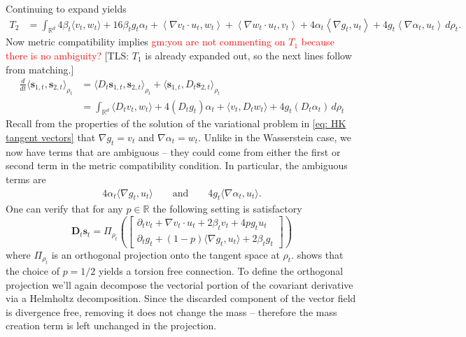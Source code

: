 \documentclass{article}
\newcommand{\tls}[1]{{\color{cyan}[TLS: #1]}}
\begin{document}
Continuing to expand yields
\begin{align}
    T_2 &= \int_{\mathbb{R}^d} 4\beta_t\langle v_t, w_t\rangle + 16\beta_tg_{t}\alpha_{t} +  \left\langle \nabla v_t \cdot u_t, w_t\right\rangle  + \left\langle\nabla w_t \cdot u_t, v_t\right\rangle + 4\alpha_{t}\left\langle\nabla g_{t}, u_t\right\rangle + 4g_{t}\left\langle \nabla \alpha_{t}, u_t\right\rangle \,d\rho_t.\end{align}
Now metric compatibility implies \textcolor{red}{gm:you are not commenting on $T_1$ because there is no ambiguity?} \tls{$T_1$ is already expanded out, so the next lines follow from matching.}
\begin{align}
    \frac{d}{dt}\langle \mathbf{s}_{1,t}, \mathbf{s}_{2,t}\rangle_{\rho_t} &= \langle D_t\mathbf{s}_{1,t}, \mathbf{s}_{2,t}\rangle_{\rho_t} + \langle \mathbf{s}_{1,t}, D_t\mathbf{s}_{2,t}\rangle_{\rho_t} \\
    &= \int_{\mathbb{R}^d}\langle D_t v_t, w_t\rangle + 4(D_tg_t)\alpha_t  + \langle v_t, D_t w_t\rangle + 4g_t(D_t\alpha_t) \, d\rho_t 
\end{align}
Recall from the properties of the solution of the variational problem in \cref{eq: HK tangent vectors} that $\nabla g_t = v_t$ and $\nabla \alpha_t = w_t.$ Unlike in the Wasserstein case, we now have terms that are ambiguous -- they could come from either the first or second term in the metric compatibility condition. In particular, the ambiguous terms are 
\begin{align}
    4\alpha_t\langle \nabla g_t, u_t\rangle \qquad \text{and} \qquad 4g_t\langle \nabla \alpha_t, u_t\rangle. 
\end{align}
One can verify that for any $p \in \mathbb{R}$ the following setting is satisfactory
\begin{equation}
    \mathbf{D}_t\mathbf{s}_t = \Pi_{\rho_t}\left(\begin{bmatrix}
        \partial_tv_t + \nabla v_t\cdot u_t + 2\beta_tv_t +  4pg_tu_t \\
        \partial_tg_t + (1-p)\langle\nabla g_t, u_t\rangle + 2\beta_t g_t
    \end{bmatrix}\right)
\end{equation}
where $\Pi_{\rho_t}$ is an orthogonal projection onto the tangent space at $\rho_t$. \citet{clancy2021interpolating}
shows that the choice of $p = 1/2$ yields a torsion free connection. To define the orthogonal projection we'll again decompose the vectorial portion of the covariant derivative via a Helmholtz decomposition. Since the discarded component of the vector field is divergence free, removing it does not change the mass -- therefore the mass creation term is left unchanged in the projection.  
\end{document}
